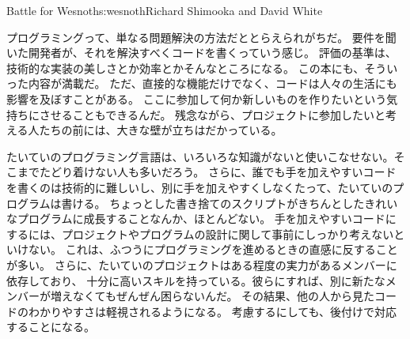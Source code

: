 \begin{aosachapter}{Battle for Wesnoth}{s:wesnoth}{Richard Shimooka and David White}

プログラミングって、単なる問題解決の方法だととらえられがちだ。
要件を聞いた開発者が、それを解決すべくコードを書くっていう感じ。
評価の基準は、技術的な実装の美しさとか効率とかそんなところになる。
この本にも、そういった内容が満載だ。
ただ、直接的な機能だけでなく、コードは人々の生活にも影響を及ぼすことがある。
ここに参加して何か新しいものを作りたいという気持ちにさせることもできるんだ。
残念ながら、プロジェクトに参加したいと考える人たちの前には、大きな壁が立ちはだかっている。

たいていのプログラミング言語は、いろいろな知識がないと使いこなせない。そこまでたどり着けない人も多いだろう。
さらに、誰でも手を加えやすいコードを書くのは技術的に難しいし、別に手を加えやすくしなくたって、たいていのプログラムは書ける。
ちょっとした書き捨てのスクリプトがきちんとしたきれいなプログラムに成長することなんか、ほとんどない。
手を加えやすいコードにするには、プロジェクトやプログラムの設計に関して事前にしっかり考えないといけない。
これは、ふつうにプログラミングを進めるときの直感に反することが多い。
さらに、たいていのプロジェクトはある程度の実力があるメンバーに依存しており、
十分に高いスキルを持っている。彼らにすれば、別に新たなメンバーが増えなくてもぜんぜん困らないんだ。
その結果、他の人から見たコードのわかりやすさは軽視されるようになる。
考慮するにしても、後付けで対応することになる。


\end{aosachapter}
